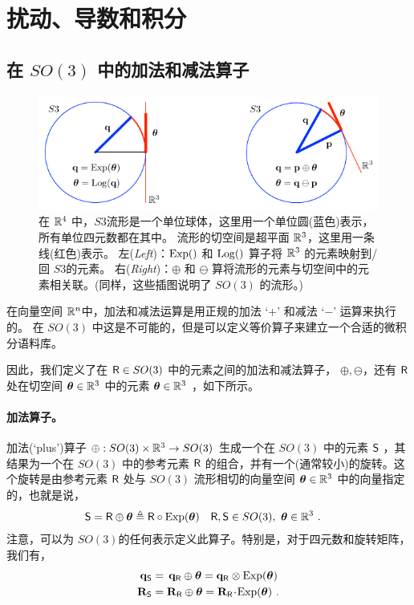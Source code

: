 \section{扰动、导数和积分}



\subsection{在 $SO(3)$ 中的加法和减法算子}

\begin{figure}[tb]
\centering
\includegraphics{figures/manifold}
\caption{在 ${\mathbb R}^4$ 中，$S3$流形是一个单位球体，这里用一个单位圆(蓝色)表示，所有单位四元数都在其中。
流形的切空间是超平面 ${\mathbb R}^3$，这里用一条线(红色)表示。
左(\emph{Left})：$\operatorname*{Exp}()$ 和 $\operatorname*{Log}()$ 算子将 ${\mathbb R}^3$ 的元素映射到/回 $S3$的元素。
右(\emph{Right})：$\oplus$ 和 $\ominus$ 算将流形的元素与切空间中的元素相关联。(同样，这些插图说明了 $SO(3)$ 的流形。)}
\label{fig:manifold}
\end{figure}

在向量空间 ${\mathbb R}^n$中，加法和减法运算是用正规的加法 `$+$' 和减法 `$-$' 运算来执行的。
在 $SO(3)$ 中这是不可能的，但是可以定义等价算子来建立一个合适的微积分语料库。 

因此，我们定义了在 $\mathsf R\in SO(3)$ 中的元素之间的加法和减法算子， $\oplus,\ominus$，还有 $\mathsf R$ 处在切空间 ${\bm \theta}\in{\mathbb R}^3$ 中的元素 ${\bm \theta}\in{\mathbb R}^3$ ，如下所示。

\paragraph{加法算子。}
加法(`plus')算子 $\oplus:SO(3)\times{\mathbb R}^3\to SO(3)$ 生成一个在 $SO(3)$ 中的元素 $\mathsf S$ ，其结果为一个在 $SO(3)$ 中的参考元素 $\mathsf R$ 的组合，并有一个(通常较小)的旋转。这个旋转是由参考元素 $\mathsf R$ 处与 $SO(3)$ 流形相切的向量空间 ${\bm \theta}\in{\mathbb R}^3$ 中的向量指定的，也就是说，
%
\begin{align}
\mathsf S = \mathsf R\oplus {\bm \theta} &\triangleq \mathsf R\circ\operatorname*{Exp}({\bm \theta}) && \mathsf R,\mathsf S\in SO(3),~ {\bm \theta}\in{\mathbb R}^3 
~.
\end{align}
%
注意，可以为 $SO(3)$的任何表示定义此算子。特别是，对于四元数和旋转矩阵，我们有，
%
\begin{align}
{\bf q}_\mathsf S &= \,{\bf q}_\mathsf R\oplus{\bm \theta} = {\bf q}_\mathsf R\otimes\operatorname*{Exp}({\bm \theta}) \\
{\bf R}_\mathsf S &= {\bf R}_\mathsf R\oplus {\bm \theta} = {\bf R}_\mathsf R\!\cdot\!\operatorname*{Exp}({\bm \theta}) 
~.
\end{align}

